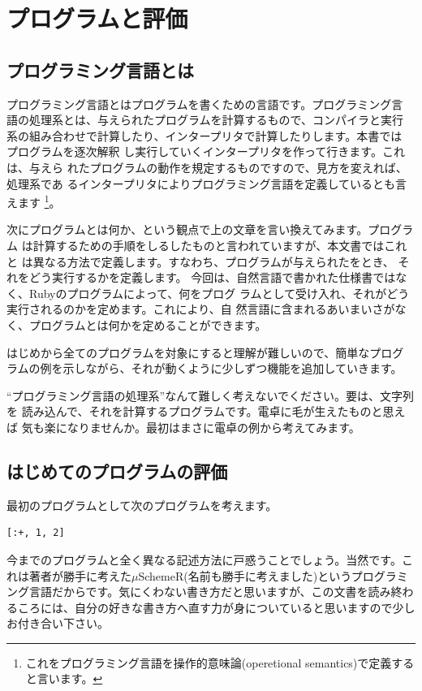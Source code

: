 \chapter{プログラムと評価\hspace{-3mm}}

\section{プログラミング言語とは}

プログラミング言語とはプログラムを書くための言語です。プログラミング言
語の処理系とは、与えられたプログラムを計算するもので、コンパイラと実行
系の組み合わせで計算したり、インタープリタで計算したりします。本書では
プログラムを逐次解釈
し実行していくインタープリタを作って行きます。これは、与えら
れたプログラムの動作を規定するものですので、見方を変えれば、処理系であ
るインタープリタによりプログラミング言語を定義しているとも言えます
\footnote{これをプログラミング言語を操作的意味論(operetional semantics)で定義すると言います。}。

次にプログラムとは何か、という観点で上の文章を言い換えてみます。プログラム
は計算するための手順をしるしたものと言われていますが、本文書ではこれと
は異なる方法で定義します。すなわち、プログラムが与えられたをとき、
それをどう実行するかを定義します。
今回は、自然言語で書かれた仕様書ではなく、Rubyのプログラムによって、何をプログ
ラムとして受け入れ、それがどう実行されるのかを定めます。これにより、自
然言語に含まれるあいまいさがなく、プログラムとは何かを定めることができます。

はじめから全てのプログラムを対象にすると理解が難しいので、簡単なプログ
ラムの例を示しながら、それが動くように少しずつ機能を追加していきます。

“プログラミング言語の処理系”なんて難しく考えないでください。要は、文字列を
読み込んで、それを計算するプログラムです。電卓に毛が生えたものと思えば
気も楽になりませんか。最初はまさに電卓の例から考えてみます。

\section{はじめてのプログラムの評価}

最初のプログラムとして次のプログラムを考えます。

\begin{lstlisting}
[:+, 1, 2]
\end{lstlisting}

今までのプログラムと全く異なる記述方法に戸惑うことでしょう。当然です。これは著者が勝手に考えた$\mu$SchemeR(名前も勝手に考えました)というプログラミング言語だからです。気にくわない書き方だと思いますが、この文書を読み終わるころには、自分の好きな書き方へ直す力が身についていると思いますので少しお付き合い下さい。

